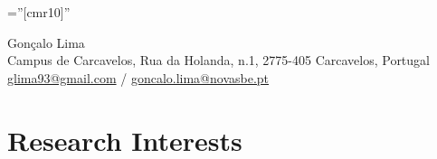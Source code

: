 \documentclass[a4paper,11pt]{article} %
\begin{document}

\font\fb=''[cmr10]'' %


\begin{center}
	\huge{Gonçalo Lima} \\
	\vspace{10pt} 
	\normalsize \href{https://www.google.com/maps/place/Nova+School+of+Business+and+Economics/@38.6800718,-9.3294805,16.58z/data=!4m5!3m4!1s0x0:0x5819eb5424580591!8m2!3d38.6784652!4d-9.3270774}{\faMapMarker} \hspace{5pt} Campus de Carcavelos, Rua da Holanda, n.1, 2775-405 Carcavelos, Portugal \\	\vspace{3pt}
	\faEnvelopeO \hspace{5pt} \href{mailto:glima93@gmail.com}{glima93@gmail.com} / \href{mailto:goncalo.lima@novasbe.pt}{goncalo.lima@novasbe.pt} \\ 	\vspace{3pt}
		\href{https://www.linkedin.com/in/gslima/}{\faLinkedinSquare}  \hspace{5pt} \href{https://github.com/glima93}{\faGithub}  \hspace{5pt} \href{https://twitter.com/GoncaloLimaEcon}{\faTwitterSquare} \hspace{5pt}
		\href{tel:glima_1993}{\faSkype} \hspace{5pt}
		\href{tel:+351964897095}{\faPhone} \hspace{5pt}
		\href{https://www.researchgate.net/profile/Goncalo_Lima}{\faInstitution} \hspace{5pt}
\end{center} 

\section[Research Interests]{\faSearch \hspace{3pt} Research Interests}
\end{document}
